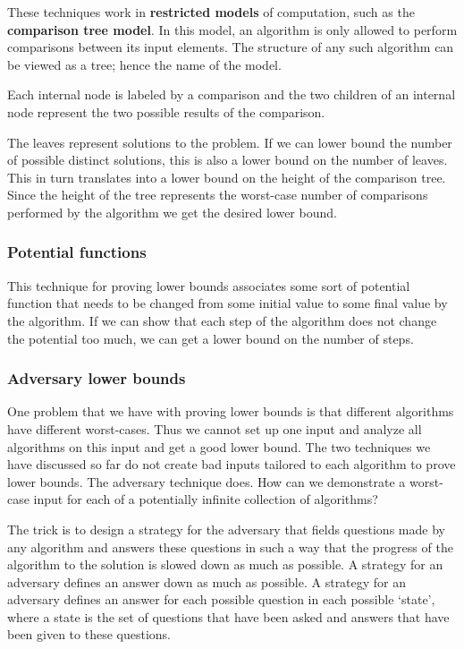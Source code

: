 \documentclass[en,hazy,blue,screen,14pt]{elegantnote}
\begin{document}
These techniques work in \textbf{restricted models} of computation,
such as the \textbf{comparison tree model}. In this model, an algorithm
is only allowed to perform comparisons between its input elements.
The structure of any such algorithm can be viewed as a tree; hence
the name of the model. 

Each internal node is labeled by a comparison and the two children
of an internal node represent the two possible results of the comparison. 

The leaves represent solutions to the problem. If we can lower bound
the number of possible distinct solutions, this is also a lower bound
on the number of leaves. This in turn translates into a lower bound
on the height of the comparison tree. Since the height of the tree
represents the worst-case number of comparisons performed by the algorithm
we get the desired lower bound. 

\subsubsection*{Potential functions}

This technique for proving lower bounds associates some sort of potential
function that needs to be changed from some initial value to some
final value by the algorithm. If we can show that each step of the
algorithm does not change the potential too much, we can get a lower
bound on the number of steps. 

\subsubsection*{Adversary lower bounds}

One problem that we have with proving lower bounds is that different
algorithms have different worst-cases. Thus we cannot set up one input
and analyze all algorithms on this input and get a good lower bound.
The two techniques we have discussed so far do not create bad inputs
tailored to each algorithm to prove lower bounds. The adversary technique
does. How can we demonstrate a worst-case input for each of a potentially
infinite collection of algorithms? 

The trick is to design a strategy for the adversary that fields questions
made by any algorithm and answers these questions in such a way that
the progress of the algorithm to the solution is slowed down as much
as possible. A strategy for an adversary defines an answer down as
much as possible. A strategy for an adversary defines an answer for
each possible question in each possible \textquoteleft state\textquoteright ,
where a state is the set of questions that have been asked and answers
that have been given to these questions. 
\end{document}

